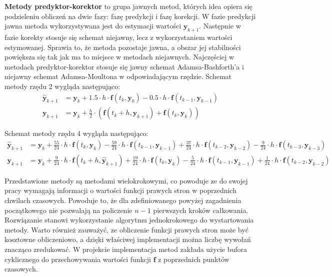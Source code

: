 \textbf{Metody predyktor-korektor} to grupa jawnych metod, których idea opiera się podzieleniu obliczeń na dwie fazy: fazę predykcji i fazę korekcji. W fazie predykcji jawna metoda wykorzystywana jest do estymacji wartości $\bm{y}_{k+1}$. Następnie w fazie korekty stosuje się schemat niejawny, lecz z wykorzystaniem wartości estymowanej. Sprawia to, że metoda pozostaje jawna, a obszar jej stabilności powiększa się tak jak ma to miejsce w metodach niejawnych. Najczęściej w metodach predyktor-korektor stosuje się jawny schemat Adamsa-Bashforth'a i niejawny schemat Adamsa-Moultona w odpowiadającym rzędzie. Schemat metody rzędu 2 wygląda następująco:
\[
	\begin{aligned}
	\bm{\hat{y}}_{k+1} & = \bm{y}_{k} + 1.5 \cdot h \cdot  \bm{f} \left( t_{k}, \bm{y}_{k} \right) - 0.5 \cdot h \cdot  \bm{f} \left( t_{k-1}, \bm{y}_{k-1} \right)\\
	\bm{y}_{k+1} & = \bm{y}_{k} + \frac{h}{2} \cdot  \left( \bm{f} \left( t_{k} + h, \bm{\hat{y}}_{k+1} \right) +  \bm{f} \left( t_{k}, \bm{y}_{k} \right) \right)
	\end{aligned}
\]

Schemat metody rzędu 4 wygląda następująco:
\[
	\begin{aligned}
	\bm{\hat{y}}_{k+1} & = \bm{y}_{k} + \frac{55}{24} \cdot h \cdot  \bm{f} \left( t_{k}, \bm{y}_{k} \right) - \frac{59}{24} \cdot h \cdot  \bm{f} \left( t_{k-1}, \bm{y}_{k-1} \right)  + \frac{37}{24} \cdot h \cdot  \bm{f} \left( t_{k-2}, \bm{y}_{k-2} \right)  - \frac{9}{24} \cdot h \cdot  \bm{f} \left( t_{k-3}, \bm{y}_{k-3} \right) \\
	\bm{y}_{k+1} & = \bm{y}_{k} +   \frac{9}{24} \cdot h \cdot \bm{f} \left( t_{k} + h, \bm{\hat{y}}_{k+1} \right) + \frac{19}{24} \cdot h \cdot  \bm{f} \left( t_{k}, \bm{y}_{k} \right) - \frac{5}{24} \cdot h \cdot  \bm{f} \left( t_{k-1}, \bm{y}_{k-1} \right)  + \frac{1}{24} \cdot h \cdot  \bm{f} \left( t_{k-2}, \bm{y}_{k-2} \right)
	\end{aligned}
\]

Przedstawione metody są metodami wielokrokowymi, co powoduje ze do swojej pracy wymagają informacji o wartości funkcji prawych stron w poprzednich chwilach czasowych. Powoduje to, że dla zdefiniowanego powyżej zagadnienia początkowego nie pozwalają na policzenie $n-1$ pierwszych kroków całkowania. Rozwiązanie stanowi wykorzystanie algorytmu jednokrokowego do wystartowania metody. Warto również zauważyć, ze obliczenie funkcji prawych stron może być kosztowne obliczeniowo, a dzięki właściwej implementacji można liczbę wywołań znacząco zredukować. W projekcie implementacja metod zakłada użycie bufora cyklicznego do przechowywania wartości funkcji $\bm{f}$ z poprzednich punktów czasowych.

